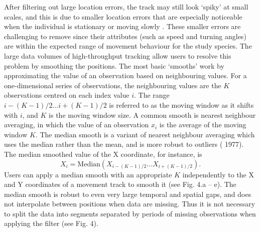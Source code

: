 \begin{refsection}[sorting=nyt]
    After filtering out large location errors, the track may still look `spiky’ at small scales, and this is due to smaller location errors that are especially noticeable when the individual is stationary or moving slowly \citep{noonan2019}.
    These smaller errors are challenging to remove since their attributes (such as speed and turning angles) are within the expected range of movement behaviour for the study species. 
    The large data volumes of high-throughput tracking allow users to resolve this problem by smoothing the positions. 
    The most basic `smooths' work by approximating the value of an observation based on neighbouring values.
    For a one-dimensional series of observations, the neighbouring values are the $K$ observations centred on each index value $i$.
    The range ${i - (K-1)/2} \ldots {i + (K-1)/2}$ is referred to as the moving window as it shifts with $i$, and $K$ is the moving window size.
    A common smooth is nearest neighbour averaging, in which the value of an observation $x_i$ is the average of the moving window $K$.
    The median smooth is a variant of nearest neighbour averaging which uses the median rather than the mean, and is more robust to outliers (\citeauthor{tukey1977} 1977).
    The median smoothed value of the X coordinate, for instance, is
        $$
            X_i = \text{Median}(X_{i - (K-1)/2} \ldots X_{i + (K-1)/2}).
        $$
    Users can apply a median smooth with an appropriate $K$ independently to the X and Y coordinates of a movement track to smooth it (see Fig. 4.a -- e).
    The median smooth is robust to even very large temporal and spatial gaps, and does not interpolate between positions when data are missing. 
    Thus it is not necessary to split the data into segments separated by periods of missing observations when applying the filter (see Fig. 4).


\end{refsection}
